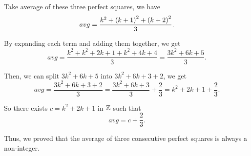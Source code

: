 \begin{itemize}
\begin{solution}
        Take average of these three perfect squares, we have 
        \begin{equation*}
            avg = \frac{k^2 + \left(k + 1\right)^2 + \left(k + 2\right)^2}{3}. 
        \end{equation*}

        By expanding each term and adding them together, we get 
        \begin{equation*}
            avg = \frac{k^2 + k^2 + 2k + 1 + k^2 + 4k + 4}{3} = \frac{3k^2 + 6k + 5}{3}. 
        \end{equation*}

        Then, we can split $3k^2 + 6k + 5$ into $3k^2 + 6k + 3 + 2$, we get 
        \[
            avg = \frac{3k^2 + 6k + 3 + 2}{3} = \frac{3k^2 + 6k + 3}{3} + \frac{2}{3} = k^2 + 2k + 1 + \frac{2}{3}. 
        \]

        So there exists $c = k^2 + 2k + 1$ in $\mathbb{Z}$ such that 
        \begin{equation*}
            avg = c + \frac{2}{3}. 
        \end{equation*}

        Thus, we proved that the average of three consecutive perfect squares is always a non-integer. 
    \end{solution}
\end{itemize}